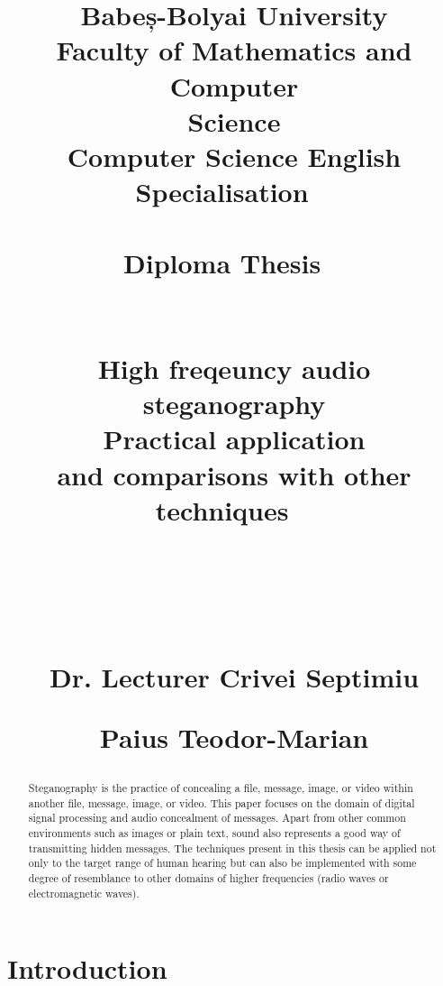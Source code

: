 \documentclass[12pt]{report}
\begin{document}
\title{%
  { \huge Babeș-Bolyai University\\
  Faculty of Mathematics and Computer\\
  Science\\
  Computer Science English Specialisation}
\ \\
  \ \\
  {\huge Diploma Thesis}
  \ \\
  \ \\
  \ \\
  High freqeuncy audio steganography\\
  Practical application \\
    and comparisons with other techniques
  \ \\
  \ \\
  \ \\
  \ \\
  {%
    \begin{flushleft}%
       Dr. Lecturer Crivei Septimiu
      \end{flushleft}}
      {%
  \begin{flushright}
      Paius Teodor-Marian
  \end{flushright} }}

\maketitle





\begin{abstract}
Steganography is the practice of concealing a file, message, image, or video within another file, message, image, or video. This paper focuses on the domain of digital signal processing and audio concealment of messages. Apart from other common environments such as images or plain text, sound also represents a good way of transmitting hidden messages. The techniques present in this thesis can be applied not only to the target range of human hearing but can also be implemented with some degree of resemblance to other domains of higher frequencies (radio waves or electromagnetic waves).
\end{abstract}

\tableofcontents


\chapter{Introduction}
\end{document}
